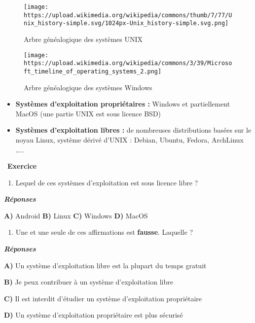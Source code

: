 \documentclass[
  11pt,
]{article}
\providecommand{\tightlist}{%
  \setlength{\itemsep}{0pt}\setlength{\parskip}{0pt}}
\newcounter{exo}
\newenvironment{exercice}[1]
{\par \medskip   \addtocounter{exo}{1} \noindent  
\begin{bclogo}[arrondi =0.1,   noborder = true, logo=\bccrayon, marge=4]{~\textbf{Exercice} \textbf{\theexo} {\itshape #1} }  \par}
{
\end{bclogo}
 \par \bigskip }
\newcounter{prop}
\newcounter{def}
\newcounter{logi}
\newcounter{histo}
\begin{document}
\begin{figure}
\centering
\texttt{[image: https://upload.wikimedia.org/wikipedia/commons/thumb/7/77/Unix\_history-simple.svg/1024px-Unix\_history-simple.svg.png]}
\caption{Arbre généalogique des systèmes UNIX}
\end{figure}

\begin{figure}
\centering
\texttt{[image: https://upload.wikimedia.org/wikipedia/commons/3/39/Microsoft\_timeline\_of\_operating\_systems\_2.png]}
\caption{Arbre généalogique des systèmes Windows}
\end{figure}

\begin{itemize}
\item
  \textbf{Systèmes d'exploitation propriétaires :} Windows et
  partiellement MacOS (une partie UNIX est sous licence BSD)
\item
  \textbf{Systèmes d'exploitation libres :} de nombreuses distributions
  basées sur le noyau Linux, système dérivé d'UNIX : Debian, Ubuntu,
  Fedora, ArchLinux \ldots{}..
\end{itemize}

\begin{exercice}{}

\begin{enumerate}
\def\labelenumi{\arabic{enumi}.}
\tightlist
\item
  Lequel de ces systèmes d'exploitation est sous licence libre ?
\end{enumerate}

\textbf{\emph{Réponses}}

\textbf{A)} Android \textbf{B)} Linux \textbf{C)} Windows \textbf{D)}
MacOS

\begin{enumerate}
\def\labelenumi{\arabic{enumi}.}
\setcounter{enumi}{1}
\tightlist
\item
  Une et une seule de ces affirmations est \textbf{fausse}. Laquelle ?
\end{enumerate}

\textbf{\emph{Réponses}}

\textbf{A)} Un système d'exploitation libre est la plupart du temps
gratuit

\textbf{B)} Je peux contribuer à un système d'exploitation libre

\textbf{C)} Il est interdit d'étudier un système d'exploitation
propriétaire

\textbf{D)} Un système d'exploitation propriétaire est plus sécurisé

\end{exercice}
\end{document}
